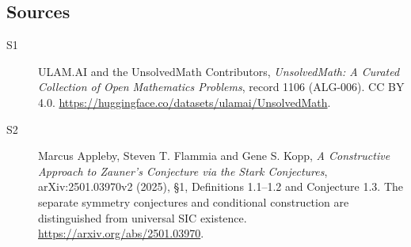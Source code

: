 \documentclass[11pt]{article}
\begin{document}
\subsection{Sources}
\begin{description}
\item[\hypertarget{source:1106:1}{S1}] ULAM.AI and the UnsolvedMath Contributors, \emph{UnsolvedMath: A Curated Collection of Open Mathematics Problems}, record 1106 (ALG-006). CC BY 4.0. \url{https://huggingface.co/datasets/ulamai/UnsolvedMath}.
\item[\hypertarget{source:1106:2}{S2}] Marcus Appleby, Steven T. Flammia and Gene S. Kopp, \emph{A Constructive Approach to Zauner’s Conjecture via the Stark Conjectures}, arXiv:2501.03970v2 (2025), §1, Definitions 1.1--1.2 and Conjecture 1.3. The separate symmetry conjectures and conditional construction are distinguished from universal SIC existence. \url{https://arxiv.org/abs/2501.03970}.
\end{description}
\label{end:1106}
\end{document}
